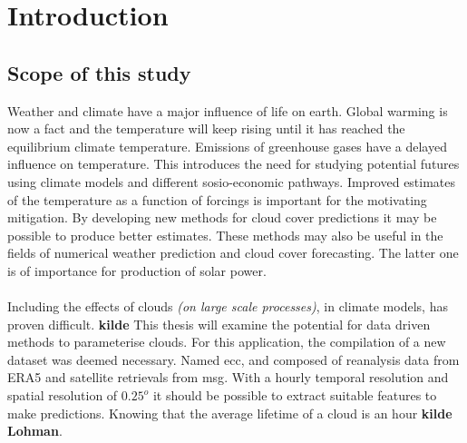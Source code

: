 \chapter{Introduction} \label{ch:introduction}
\section{Scope of this study}
Weather and climate have a major influence of life on earth. Global warming is now a fact and the temperature will keep rising until it has reached the equilibrium climate temperature. Emissions of greenhouse gases have a delayed influence on temperature. This introduces the need for studying potential futures using climate models and different sosio-economic pathways. Improved estimates of the temperature as a function of forcings is important for the motivating mitigation. By developing new methods for cloud cover predictions it may be possible to produce better estimates. These methods may also be useful in the fields of numerical weather prediction and cloud cover forecasting. The latter one is of importance for production of solar power.
\\ \\
Including the effects of clouds \textit{(on large scale processes)}, in climate models, has proven difficult. \textbf{kilde} This thesis will examine the potential for data driven methods to parameterise clouds. For this application, the compilation of a new dataset was deemed necessary. Named \acrfull{ecc}, and composed of reanalysis data from ERA5 and satellite retrievals from \acrfull{msg}. With a hourly temporal resolution and spatial resolution of $0.25^o$ it should be possible to extract suitable features to make predictions. Knowing that the average lifetime of a cloud is an hour \textbf{kilde Lohman}.
\\ \\ 
